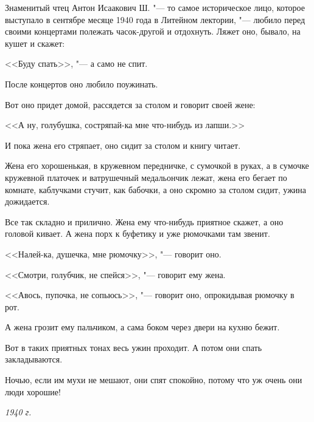 Знаменитый чтец Антон Исаакович Ш. "--- то самое историческое лицо, которое выступало в сентябре месяце 1940 года в Литейном лектории, "--- любило перед своими концертами полежать часок-другой и отдохнуть. Ляжет оно, бывало, на кушет и скажет:

<<Буду спать>>, "--- а само не спит.

После концертов оно любило поужинать.

Вот оно придет домой, рассядется за столом и говорит своей жене:

<<А ну, голубушка, состряпай-ка мне что-нибудь из лапши.>>

И пока жена его стряпает, оно сидит за столом и книгу читает.

Жена его хорошенькая, в кружевном передничке, с сумочкой в руках, а в сумочке кружевной платочек и ватрушечный медальончик лежат, жена его бегает по комнате, каблучками стучит, как бабочки, а оно скромно за столом сидит, ужина дожидается.

Все так складно и прилично. Жена ему что-нибудь приятное скажет, а оно головой кивает. А жена порх к буфетику и уже рюмочками там звенит.

<<Налей-ка, душечка, мне рюмочку>>, "--- говорит оно.

<<Смотри, голубчик, не спейся>>, "--- говорит ему жена.

<<Авось, пупочка, не сопьюсь>>, "--- говорит оно, опрокидывая рюмочку в рот.

А жена грозит ему пальчиком, а сама боком через двери на кухню бежит.

Вот в таких приятных тонах весь ужин проходит. А потом они спать закладываются.

Ночью, если им мухи не мешают, они спят спокойно, потому что уж очень они люди хорошие!

\medskip
\noindent\textit{1940 г.}